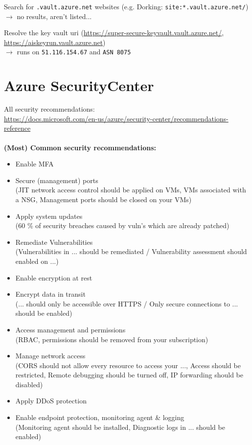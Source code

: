 \documentclass[12pt]{article}
\begin{document}

Search for \verb|.vault.azure.net| websites (e.g. Dorking: \verb|site:*.vault.azure.net/|)\\
$\rightarrow$ no results, aren't listed...

Resolve the key vault uri (\url{https://super-secure-keyvault.vault.azure.net/}, \url{https://aiskeyrun.vault.azure.net}) \\
$\rightarrow$ runs on \verb|51.116.154.67| and \verb|ASN 8075|


\section*{Azure SecurityCenter}
All security recommendations:\\  \url{https://docs.microsoft.com/en-us/azure/security-center/recommendations-reference} \\ \\
\textbf{(Most) Common security recommendations:}
\begin{itemize}
    \item Enable MFA
    \item Secure (management) ports \\ 
    (JIT network access control should be applied on VMs, VMs associated with a NSG, Management ports should be closed on your VMs)
    \item Apply system updates \\
    (60 \% of security breaches caused by vuln's which are already patched)
    \item Remediate Vulnerabilities \\
    (Vulnerabilities in ... should be remediated / Vulnerability assessment should enabled on ...)
    \item Enable encryption at rest
    \item Encrypt data in transit \\
    (... should only be accessible over HTTPS / Only secure connections to ... should be enabled)
    \item Access management and permissions \\
    (RBAC, permissions should be removed from your subscription)
    \item Manage network access \\
    (CORS should not allow every resource to access your ..., Access should be restricted, Remote debugging should be turned off, IP forwarding should be disabled)
    \item Apply DDoS protection
    \item Enable endpoint protection, monitoring agent \& logging \\
    (Monitoring agent should be installed, Diagnostic logs in ... should be enabled)
\end{itemize}
\end{document}
